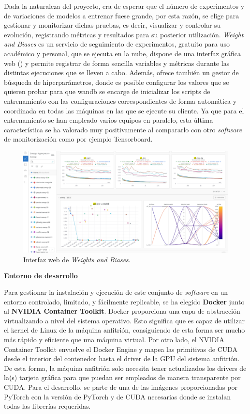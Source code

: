 Dada la naturaleza del proyecto, era de esperar que el número de experimentos y de variaciones de modelos a entrenar fuese grande, por esta razón, se elige  \cite{wandb} para gestionar y monitorizar dichas pruebas, es decir, visualizar y controlar su evolución, registrando métricas y resultados para su posterior utilización. \textit{Weight and Biases} es un servicio de seguimiento de experimentos, gratuito para uso académico y personal, que se ejecuta en la nube, dispone de una interfaz gráfica web () y permite registrar de forma sencilla variables y métricas durante las distintas ejecuciones que se lleven a cabo. Además, ofrece también un gestor de búsqueda de hiperparámetros, donde es posible configurar los valores que se quieren probar para que wandb se encarge de inicializar los scripts de entrenamiento con las configuraciones correspondientes de forma automática y coordinada en todas las máquinas en las que se ejecute su cliente. Ya que para el entrenamiento se han empleado varios equipos en paralelo, esta última característica se ha valorado muy positivamente al compararlo con otro \textit{software} de monitorización como por ejemplo Tensorboard.

\begin{figure}[H]
\centering
\includegraphics[width=\textwidth]{imagenes/wandb-ui.png}
\caption{Interfaz web de \textit{Weights and Biases}.}
\label{fig:wandb-ui}
\end{figure}

\pagebreak

\textbf{Entorno de desarrollo}

Para gestionar la instalación y ejecución de este conjunto de \textit{software} en un entorno controlado, limitado, y fácilmente replicable, se ha elegido \textbf{Docker} junto al \textbf{NVIDIA Container Toolkit}. Docker proporciona una capa de abstracción virtualizando a nivel del sistema operativo. Esto significa que es capaz de utilizar el kernel de Linux de la máquina anfitrión, consiguiendo de esta forma ser mucho más rápido y eficiente que una máquina virtual. Por otro lado, el NVIDIA Container Toolkit envuelve el Docker Engine y mapea las primitivas de CUDA desde el interior del contenedor hasta el driver de la GPU del sistema anfitrión. De esta forma, la máquina anfitrión solo necesita tener actualizados los drivers de la(s) tarjeta gráfica para que puedan ser empleados de manera transparente por CUDA. Para el desarrollo, se parte de una de las imágenes proporcionadas por PyTorch con la versión de PyTorch y de CUDA necesarias donde se instalan todas las librerías requeridas. 

